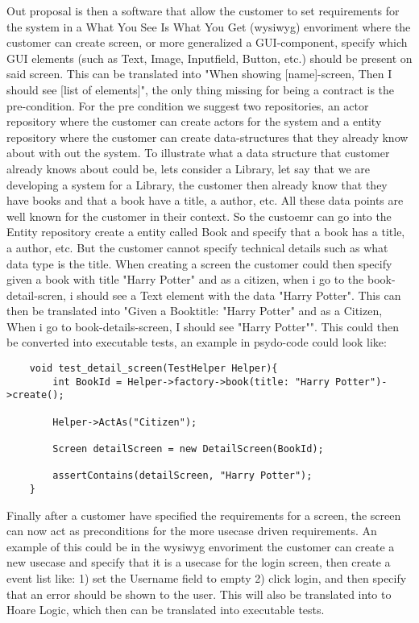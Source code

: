 Out proposal is then a software that allow the customer to set requirements for the system in a What You See Is What You Get (wysiwyg) envoriment where the customer can create screen, or more generalized a GUI-component, specify which GUI elements (such as Text, Image, Inputfield, Button, etc.) should be present on said screen. This can be translated into "When showing [name]-screen, Then I should see [list of elements]", the only thing missing for being a contract is the pre-condition. For the pre condition we suggest two repositories, an actor repository where the customer can create actors for the system and a entity repository where the customer can create data-structures that they already know about with out the system. To illustrate what a data structure that customer already knows about could be, lets consider a Library, let say that we are developing a system for a Library, the customer then already know that they have books and that a book have a title, a author, etc. All these data points are well known for the customer in their context. So the custoemr can go into the Entity repository create a entity called Book and specify that a book has a title, a author, etc. But the customer cannot specify technical details such as what data type is the title. When creating a screen the customer could then specify given a book with title "Harry Potter" and as a citizen, when i go to the book-detail-scren, i should see a Text element with the data "Harry Potter". This can then be translated into "Given a Book{title: "Harry Potter"} and as a Citizen, When i go to book-details-screen, I should see "Harry Potter"". This could then be converted into executable tests, an example in psydo-code could look like:

\begin{lstlisting}
    void test_detail_screen(TestHelper Helper){
        int BookId = Helper->factory->book(title: "Harry Potter")->create();

        Helper->ActAs("Citizen");

        Screen detailScreen = new DetailScreen(BookId);

        assertContains(detailScreen, "Harry Potter");
    }
\end{lstlisting}


Finally after a customer have specified the requirements for a screen, the screen can now act as preconditions for the more usecase driven requirements. An example of this could be in the wysiwyg envoriment the customer can create a new usecase and specify that it is a usecase for the login screen, then create a event list like: 1) set the Username field to empty 2) click login, and then specify that an error should be shown to the user. This will also be translated into to Hoare Logic, which then can be translated into executable tests.

